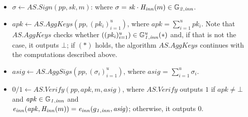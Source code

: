 \begin{construction}
\begin{itemize}
\item $\sigma \leftarrow \mathit{AS.Sign}(\mathit{pp}, \mathit{sk}, m)$: 
where $\sigma = \mathit{sk} \cdot \mathit{H}_{\mathit{inn}}(m) \in \mathbb{G}_{\mathit{2,inn}}$.

\item $\mathit{apk} \leftarrow \mathit{AS.AggKeys}(\mathit{pp}, (\mathit{pk_i})_{i=1}^{u})$, where  $\mathit{apk} = \sum_{i=1}^{u} \mathit{pk_i}$. 
Note that $\mathit{AS.AggKeys}$ checks whether $((\mathit{pk_i})_{i=1}^{u}) \in \mathbb{G}_{\mathit{1,inn}}^{u} (\ast)$ and, if that is not the case, it outputs $\bot$; 
if $(\ast)$ holds, the algorithm $\mathit{AS.AggKeys}$ continues with the computations described above. 


\item $\mathit{asig} \leftarrow \mathit{AS.AggSigs}(\mathit{pp}, (\sigma_i)_{i=1}^u)$, where $\mathit{asig}$ = $\sum_{i=1}^{u} \sigma_i$.  

\item $0/1 \leftarrow  \mathit{AS.Verify}(\mathit{pp}, \mathit{apk}, m, \mathit{asig})$, where $\mathit{AS.Verify}$ outputs $1$ if $\mathit{apk} \neq \bot$ and
$\mathit{apk} \in \mathbb{G}_{\mathit{1,inn}}$ and \\ $\mathit{e}_{\mathit{inn}}(\mathit{apk}, \mathit{H}_{\mathit{inn}}(m)) = \mathit{e}_{\mathit{inn}}(g_{\mathit{1,inn}}, \mathit{asig})$; otherwise, it outputs $0$.
\end{itemize}
\end{construction}